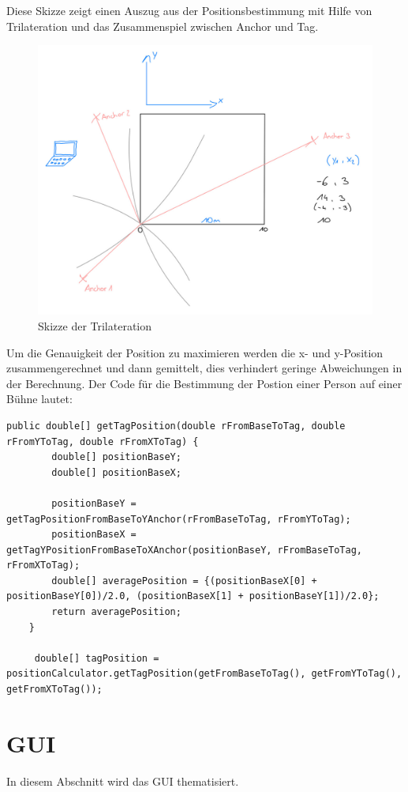 Diese Skizze zeigt einen Auszug aus der Positionsbestimmung mit Hilfe von Trilateration und das Zusammenspiel zwischen Anchor und Tag. 
\begin{figure}[H]
	\centering
	\includegraphics[width=0.8\linewidth]{images/Trilaterationskizze.jpeg}
	\caption[Trilaterationskizze]{Skizze der Trilateration}
	\label{fig:Trilaterationskizze}
\end{figure}

\newpage
Um die Genauigkeit der Position zu maximieren werden die x- und y-Position zusammengerechnet und dann gemittelt, dies verhindert geringe Abweichungen in der Berechnung. Der Code für die Bestimmung der Postion einer Person auf einer Bühne lautet:
\begin{lstlisting}[style=Java, caption=Trilateration in Java, captionpos=b]
	public double[] getTagPosition(double rFromBaseToTag, double rFromYToTag, double rFromXToTag) {
		double[] positionBaseY;
		double[] positionBaseX;
		
		positionBaseY = getTagPositionFromBaseToYAnchor(rFromBaseToTag, rFromYToTag);
		positionBaseX = getTagYPositionFromBaseToXAnchor(positionBaseY, rFromBaseToTag, rFromXToTag);
		double[] averagePosition = {(positionBaseX[0] + positionBaseY[0])/2.0, (positionBaseX[1] + positionBaseY[1])/2.0};
		return averagePosition;
	}
	
	 double[] tagPosition = positionCalculator.getTagPosition(getFromBaseToTag(), getFromYToTag(), getFromXToTag());
\end{lstlisting}

\newpage
\section{GUI}
In diesem Abschnitt wird das GUI thematisiert.


